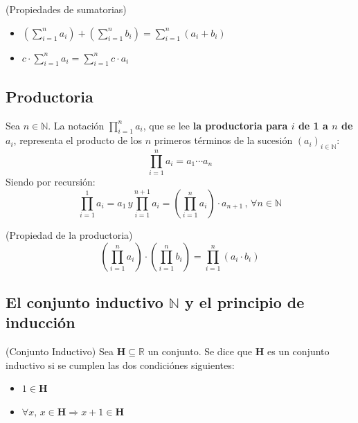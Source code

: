 \documentclass[10pt]{article}
\begin{document}
\begin{prop}(Propiedades de sumatorias)
\begin{itemize}
	\item $\left( \displaystyle\sum^{n}_{i=1} a_i \right) + \left( \displaystyle\sum^{n}_{i=1} b_i \right) =  \displaystyle\sum^{n}_{i=1} (a_i + b_i)$ 
	\item  $ c \cdot \displaystyle\sum^{n}_{i=1} a_i = \displaystyle\sum^{n}_{i=1} c \cdot a_i$
\end{itemize}
\end{prop}

\begin{center}
 \subsection{Productoria}
\end{center}

\begin{defi}
Sea $n \in \mathbb{N}$. La notación $\displaystyle \prod_{i=1}^{n} a_i$, que se lee \textbf{la productoria para $i$ de 1 a $n$ de $a_i$}, representa el producto de los $n$ primeros términos de la sucesión $(a_i)_{i \in \mathbb{N}}$:
$$\displaystyle \prod_{i=1}^{n} a_i = a_1 \cdots a_n$$
Siendo por recursión:
$$\displaystyle \prod_{i=1}^{1} a_i = a_1 \, y \displaystyle \prod_{i=1}^{n+1} a_i = \left( \displaystyle \prod_{i=1}^{n} a_i \right) \cdot a_{n+1} \, , \, \forall n \in \mathbb{N}$$
\end{defi}
\begin{prop}(Propiedad de la productoria)
$$\left( \displaystyle \prod_{i=1}^{n} a_i \right) \cdot \left( \displaystyle \prod_{i=1}^{n} b_i \right) =  \displaystyle \prod_{i=1}^{n} (a_i \cdot b_i)$$
\end{prop}

\begin{center}
 \subsection{El conjunto inductivo $\mathbb{N}$ y el principio de inducción}
\end{center}

\begin{defi}(Conjunto Inductivo)
Sea $\mathbf{H} \subseteq \mathbb{R}$  un conjunto.  Se dice que $\mathbf{H}$ es un conjunto inductivo si se cumplen las dos condiciónes siguientes:
\begin{itemize}
	\item $1 \in \mathbf{H}$
	\item $\forall x, \, x \in \mathbf{H} \Rightarrow x + 1 \in \mathbf{H}$ 
\end{itemize}
\end{defi}
\end{document}
